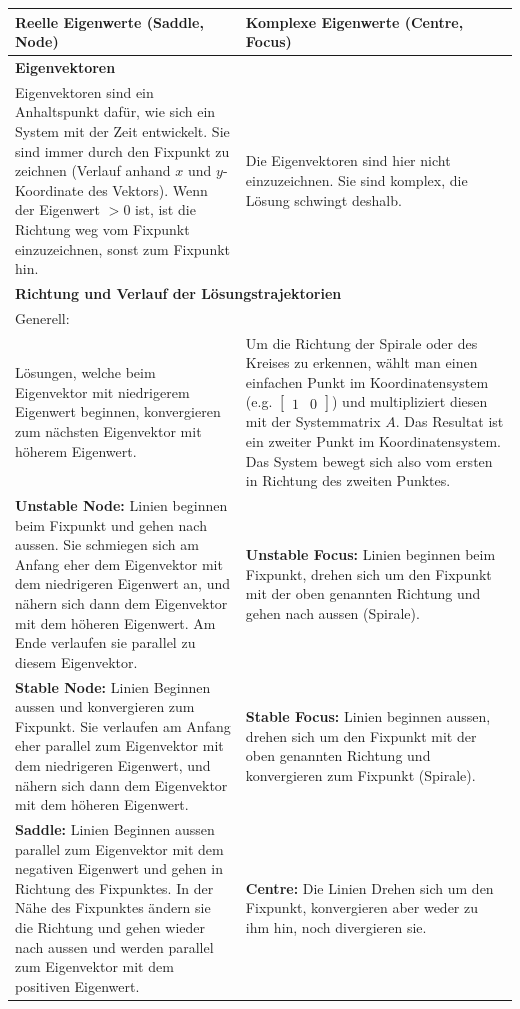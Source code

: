 \begin{longtable}{|p{}|p{}|}
	\hline
	\textbf{Reelle Eigenwerte (Saddle, Node)} & \textbf{Komplexe Eigenwerte (Centre, Focus)}\\
	\hline
	\endhead
	\multicolumn{2}{l}{\textbf{Eigenvektoren}}\\
	\hline
	Eigenvektoren sind ein Anhaltspunkt dafür, wie sich ein System mit der Zeit entwickelt. Sie sind immer durch den Fixpunkt zu zeichnen (Verlauf anhand $x$ und $y$-Koordinate des Vektors). Wenn der Eigenwert $> 0$ ist, ist die Richtung weg vom Fixpunkt einzuzeichnen, sonst zum Fixpunkt hin.
		& Die Eigenvektoren sind hier nicht einzuzeichnen. Sie sind komplex, die Lösung schwingt deshalb.\\
	\hline
	\multicolumn{2}{l}{\textbf{Richtung und Verlauf der Lösungstrajektorien}}\\
	\hline
	\multicolumn{2}{|l|}{Generell:}\\
	\hline
	Lösungen, welche beim Eigenvektor mit niedrigerem Eigenwert beginnen, konvergieren zum nächsten Eigenvektor mit höherem Eigenwert.
		& Um die Richtung der Spirale oder des Kreises zu erkennen, wählt man einen einfachen Punkt im Koordinatensystem (e.g. $\begin{bmatrix}1 & 0\end{bmatrix}$) und multipliziert diesen mit der Systemmatrix $A$. Das Resultat ist ein zweiter Punkt im Koordinatensystem. Das System bewegt sich also vom ersten in Richtung des zweiten Punktes.\\
	\hline
	\textbf{Unstable Node:}\newline
	Linien beginnen beim Fixpunkt und gehen nach aussen. Sie schmiegen sich am Anfang eher dem Eigenvektor mit dem niedrigeren Eigenwert an, und nähern sich dann dem Eigenvektor mit dem höheren Eigenwert. Am Ende verlaufen sie parallel zu diesem Eigenvektor.
		& \textbf{Unstable Focus:}\newline
			Linien beginnen beim Fixpunkt, drehen sich um den Fixpunkt mit der oben genannten Richtung und gehen nach aussen (Spirale).\\
	\textbf{Stable Node:}\newline
	Linien Beginnen aussen und konvergieren zum Fixpunkt. Sie verlaufen am Anfang eher parallel zum Eigenvektor mit dem niedrigeren Eigenwert, und nähern sich dann dem Eigenvektor mit dem höheren Eigenwert.
		& \textbf{Stable Focus:}\newline			
			Linien beginnen aussen, drehen sich um den Fixpunkt mit der oben genannten Richtung und konvergieren zum Fixpunkt (Spirale).\\
	\textbf{Saddle:}\newline
	Linien Beginnen aussen parallel zum Eigenvektor mit dem negativen Eigenwert und gehen in Richtung des Fixpunktes. In der Nähe des Fixpunktes ändern sie die Richtung und gehen wieder nach aussen und werden parallel zum Eigenvektor mit dem positiven Eigenwert.
		& \textbf{Centre:}\newline
			Die Linien Drehen sich um den Fixpunkt, konvergieren aber weder zu ihm hin, noch divergieren sie.\\
	\hline
\end{longtable}

